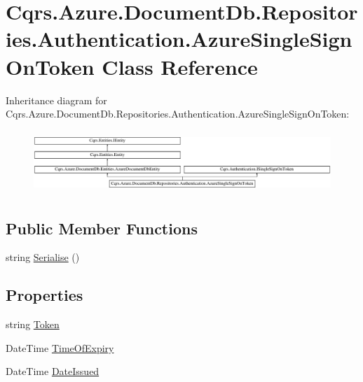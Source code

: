 \hypertarget{classCqrs_1_1Azure_1_1DocumentDb_1_1Repositories_1_1Authentication_1_1AzureSingleSignOnToken}{}\section{Cqrs.\+Azure.\+Document\+Db.\+Repositories.\+Authentication.\+Azure\+Single\+Sign\+On\+Token Class Reference}
\label{classCqrs_1_1Azure_1_1DocumentDb_1_1Repositories_1_1Authentication_1_1AzureSingleSignOnToken}
Inheritance diagram for Cqrs.\+Azure.\+Document\+Db.\+Repositories.\+Authentication.\+Azure\+Single\+Sign\+On\+Token\+:\begin{figure}[H]
\begin{center}
\leavevmode
\includegraphics[height=2.403434cm]{classCqrs_1_1Azure_1_1DocumentDb_1_1Repositories_1_1Authentication_1_1AzureSingleSignOnToken}
\end{center}
\end{figure}
\subsection*{Public Member Functions}
\begin{DoxyCompactItemize}
\item 
string \hyperlink{classCqrs_1_1Azure_1_1DocumentDb_1_1Repositories_1_1Authentication_1_1AzureSingleSignOnToken_a55c07b93600e6863985b50d4df346af0_a55c07b93600e6863985b50d4df346af0}{Serialise} ()
\end{DoxyCompactItemize}
\subsection*{Properties}
\begin{DoxyCompactItemize}
\item 
string \hyperlink{classCqrs_1_1Azure_1_1DocumentDb_1_1Repositories_1_1Authentication_1_1AzureSingleSignOnToken_ad8db4fad59b85056e4e37c9e29226425_ad8db4fad59b85056e4e37c9e29226425}{Token}
\item 
Date\+Time \hyperlink{classCqrs_1_1Azure_1_1DocumentDb_1_1Repositories_1_1Authentication_1_1AzureSingleSignOnToken_a72467ad344da70ee03355d03f9a3f25e_a72467ad344da70ee03355d03f9a3f25e}{Time\+Of\+Expiry}
\item 
Date\+Time \hyperlink{classCqrs_1_1Azure_1_1DocumentDb_1_1Repositories_1_1Authentication_1_1AzureSingleSignOnToken_a1443fa350c304438a9a57c458717eeef_a1443fa350c304438a9a57c458717eeef}{Date\+Issued}
\end{DoxyCompactItemize}


